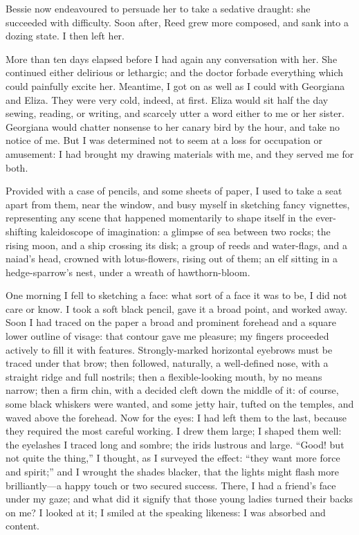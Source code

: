 Bessie now endeavoured to persuade her to take a sedative draught: she
succeeded with difficulty. Soon after, \Mrs{} Reed grew more composed,
and sank into a dozing state. I then left her.

More than ten days elapsed before I had again any conversation with
her. She continued either delirious or lethargic; and the doctor
forbade everything which could painfully excite her. Meantime, I got on
as well as I could with Georgiana and Eliza. They were very cold,
indeed, at first. Eliza would sit half the day sewing, reading, or
writing, and scarcely utter a word either to me or her sister.
Georgiana would chatter nonsense to her canary bird by the hour, and
take no notice of me. But I was determined not to seem at a loss for
occupation or amusement: I had brought my drawing materials with me, and
they served me for both.

Provided with a case of pencils, and some sheets of paper, I used to
take a seat apart from them, near the window, and busy myself in
sketching fancy vignettes, representing any scene that happened
momentarily to shape itself in the ever-shifting kaleidoscope of
imagination: a glimpse of sea between two rocks; the rising moon, and a
ship crossing its disk; a group of reeds and water-flags, and a naiad's
head, crowned with lotus-flowers, rising out of them; an elf sitting in
a hedge-sparrow's nest, under a wreath of hawthorn-bloom.

One morning I fell to sketching a face: what sort of a face it was to
be, I did not care or know. I took a soft black pencil, gave it a broad
point, and worked away. Soon I had traced on the paper a broad and
prominent forehead and a square lower outline of visage: that contour
gave me pleasure; my fingers proceeded actively to fill it with
features. Strongly-marked horizontal eyebrows must be traced under that
brow; then followed, naturally, a well-defined nose, with a straight
ridge and full nostrils; then a flexible-looking mouth, by no means
narrow; then a firm chin, with a decided cleft down the middle of it: of
course, some black whiskers were wanted, and some jetty hair, tufted on
the temples, and waved above the forehead. Now for the eyes: I had left
them to the last, because they required the most careful working. I
drew them large; I shaped them well: the eyelashes I traced long and
sombre; the irids lustrous and large. \enquote{Good! but not quite the
	thing,} I thought, as I surveyed the effect: \enquote{they want more
	force and spirit;} and I wrought the shades blacker, that the lights
might flash more brilliantly---a happy touch or two secured success.
There, I had a friend's face under my gaze; and what did it signify that
those young ladies turned their backs on me? I looked at it; I smiled
at the speaking likeness: I was absorbed and content.

